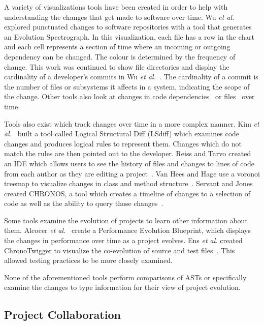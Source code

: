 A variety of visualizations tools have been created in order to help with understanding the changes that get made to software over time. Wu \textit{et al.}~\cite{wu2004a} explored punctuated changes to software repositories with a tool that generates an Evolution Spectrograph. In this visualization, each file has a row in the chart and each cell represents a section of time where an incoming or outgoing dependency can be changed. The colour is determined by the frequency of change. This work was continued to show file directories and display the cardinality of a developer's commits in Wu \textit{et al.}~\cite{wu2004}. The cardinality of a commit is the number of files or subsystems it affects in a system, indicating the scope of the change. Other tools also look at changes in code dependencies~\cite{6980224} or files~\cite{6650525, 7332421,voinea2006} over time.

Tools also exist which track changes over time in a more complex manner. Kim \textit{et al.}~\cite{Kim:2009:DRS:1555001.1555046} built a tool called Logical Structural Diff (LSdiff) which examines code changes and produces logical rules to represent them. Changes which do not match the rules are then pointed out to the developer. Reiss and Tarvo created an IDE which allows users to see the history of files and changes to lines of code from each author as they are editing a project~\cite{6650521}. Van Hees and Hage use a voronoi treemap to visualize changes in class and method structure~\cite{7332410}. Servant and Jones created CHRONOS, a tool which creates a timeline of changes to a selection of code as well as the ability to query those changes~\cite{6650547}.

Some tools examine the evolution of projects to learn other information about them. Alcocer \textit{et al.}~\cite{6650523} create a Performance Evolution Blueprint, which displays the changes in performance over time as a project evolves. Ens \textit{et al.} created ChronoTwigger to visualize the co-evolution of source and test files~\cite{6980223}. This allowed testing practices to be more closely examined.

None of the aforementioned tools perform comparisons of ASTs or specifically examine the changes to type information for their view of project evolution.

\subsection{Project Collaboration}

